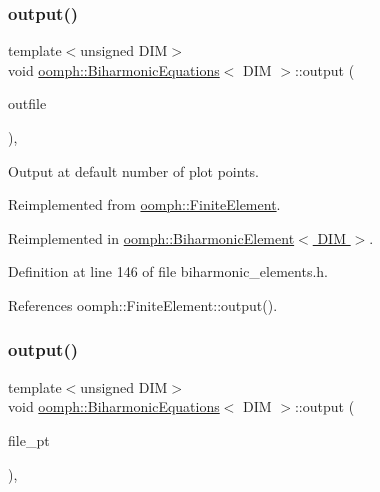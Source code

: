 \subsubsection{\texorpdfstring{output()}{output()}\hspace{0.1cm}{\footnotesize\ttfamily [2/4]}}
{\footnotesize\ttfamily template$<$unsigned D\+IM$>$ \\
void \hyperlink{classoomph_1_1BiharmonicEquations}{oomph\+::\+Biharmonic\+Equations}$<$ D\+IM $>$\+::output (\begin{DoxyParamCaption}\item[{std\+::ostream \&}]{outfile }\end{DoxyParamCaption})\hspace{0.3cm}{\ttfamily [inline]}, {\ttfamily [virtual]}}



Output at default number of plot points. 



Reimplemented from \hyperlink{classoomph_1_1FiniteElement_a2ad98a3d2ef4999f1bef62c0ff13f2a7}{oomph\+::\+Finite\+Element}.



Reimplemented in \hyperlink{classoomph_1_1BiharmonicElement_a03e56665ab48baab03924992830976c6}{oomph\+::\+Biharmonic\+Element$<$ D\+I\+M $>$}.



Definition at line 146 of file biharmonic\+\_\+elements.\+h.



References oomph\+::\+Finite\+Element\+::output().

\mbox{\label{classoomph_1_1BiharmonicEquations_aab220ac5f1da0181b400b2b360889229}} 
\subsubsection{\texorpdfstring{output()}{output()}\hspace{0.1cm}{\footnotesize\ttfamily [3/4]}}
{\footnotesize\ttfamily template$<$unsigned D\+IM$>$ \\
void \hyperlink{classoomph_1_1BiharmonicEquations}{oomph\+::\+Biharmonic\+Equations}$<$ D\+IM $>$\+::output (\begin{DoxyParamCaption}\item[{F\+I\+LE $\ast$}]{file\+\_\+pt }\end{DoxyParamCaption})\hspace{0.3cm}{\ttfamily [inline]}, {\ttfamily [virtual]}}



